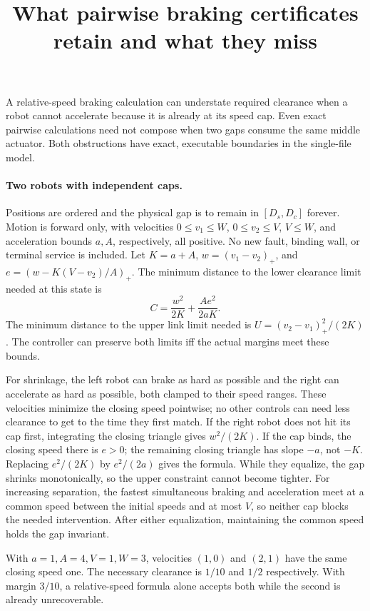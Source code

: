 \documentclass[11pt]{article}
\title{What pairwise braking certificates retain and what they miss}
\begin{document}
\maketitle

A relative-speed braking calculation can understate required
clearance when a robot cannot accelerate because it is already
at its speed cap. Even exact pairwise calculations need not
compose when two gaps consume the same middle actuator.
Both obstructions have exact, executable boundaries in the
single-file model.

\paragraph{Two robots with independent caps.}
Positions are ordered and the physical gap is to remain in
\([D_s,D_c]\) forever. Motion is forward only, with velocities
\(0\le v_1\le W\), \(0\le v_2\le V\), \(V\le W\), and
acceleration bounds \(a,A\), respectively, all positive.
No new fault, binding wall, or terminal service is included.
Let \(K=a+A\), \(w=(v_1-v_2)_+\), and
\(e=(w-K(V-v_2)/A)_+\).
The minimum distance to the lower clearance limit needed
at this state is
\[
              C=\frac{w^2}{2K}+\frac{A e^2}{2aK}.
\]
The minimum distance to the upper link limit needed is
\(U=(v_2-v_1)_+^2/(2K)\). The controller can preserve both
limits iff the actual margins meet these bounds.

For shrinkage, the left robot can brake as hard as possible and
the right can accelerate as hard as possible, both clamped to their
speed ranges. These velocities minimize the closing speed pointwise;
no other controls can need less clearance to get to the time they
first match. If the right robot does not hit its cap first, integrating
the closing triangle gives \(w^2/(2K)\). If the cap binds, the
closing speed there is \(e>0\); the remaining closing triangle has
slope \(-a\), not \(-K\). Replacing \(e^2/(2K)\) by \(e^2/(2a)\)
gives the formula. While they equalize, the gap shrinks monotonically,
so the upper constraint cannot become tighter. For increasing
separation, the fastest simultaneous braking and acceleration
meet at a common speed between the initial speeds and at most \(V\),
so neither cap blocks the needed intervention. After either
equalization, maintaining the common speed holds the gap invariant.

With \(a=1,A=4,V=1,W=3\), velocities \((1,0)\) and \((2,1)\)
have the same closing speed one. The necessary clearance is \(1/10\)
and \(1/2\) respectively. With margin \(3/10\), a relative-speed
formula alone accepts both while the second is already unrecoverable.
\end{document}
